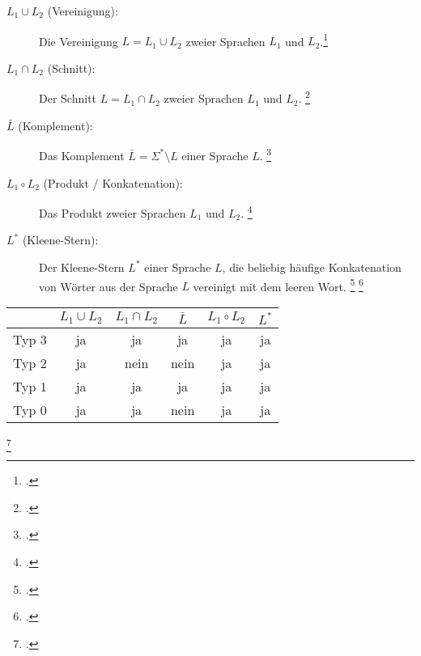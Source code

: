 \documentclass{bschlangaul-theorie}
\begin{document}
\begin{description}

%

\item[$L_1 \cup L_2$ (Vereinigung):]

Die Vereinigung $L = L_1 \cup L_2$ zweier Sprachen $L_1$ und
$L_2$.\footcite{wiki:menge}

%

\item[$L_1 \cap L_2$ (Schnitt):]

Der Schnitt $L = L_1 \cap L_2$ zweier Sprachen $L_1$ und $L_2$.
\footcite{wiki:menge}

%

\item[$\bar L$ (Komplement):]

Das Komplement $\bar L = \Sigma^* \setminus L$ einer Sprache
$L$.
\footcite{wiki:komplement}

%

\item[$L_1 \circ L_2$ (Produkt / Konkatenation):]

Das Produkt  zweier
Sprachen $L_1$ und $L_2$.
\footcite{wiki:formale-sprache}

%

\item[$L^*$ (Kleene-Stern):]

Der Kleene-Stern $L^*$ einer Sprache $L$, \dh die beliebig
häufige Konkatenation von Wörter aus der Sprache $L$ vereinigt mit dem
leeren Wort.
\footcite[Seite 68]{theo:fs:1}
\footcite{wiki:kleensche-huelle}
\end{description}

{
\footnotesize
\begin{tabular}{r|c|c|c|c|c}
&
$L_1 \cup L_2$ &
$L_1 \cap L_2$  &
$\bar L$ &
$L_1 \circ L_2$ &
$L^*$ \\\hline
Typ 3 & ja   & ja   & ja   & ja   & ja \\
Typ 2 & ja   & nein & nein & ja   & ja \\
Typ 1 & ja   & ja   & ja   & ja   & ja \\
Typ 0 & ja   & ja   & nein & ja   & ja \\
\end{tabular}
}
\footcite[Seite 33]{theo:fs:1}

%
\end{document}
